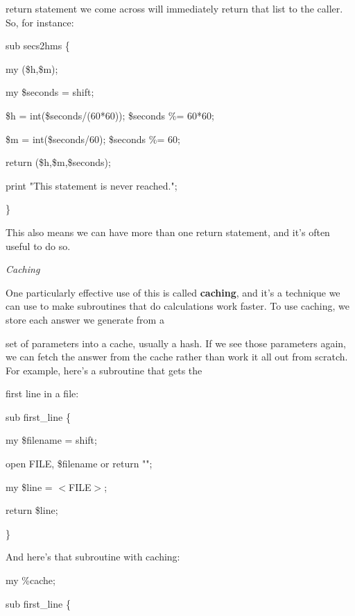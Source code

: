 \documentclass[a4paper,11pt]{book}
\begin{document}
\noindent return statement we come across will immediately return that list to the caller. So, for instance:

\noindent 

\noindent 

\noindent sub secs2hms \{

\noindent my (\$h,\$m);

\noindent my \$seconds = shift;

\noindent \$h = int(\$seconds/(60*60)); \$seconds \%= 60*60;

\noindent \$m = int(\$seconds/60); \$seconds \%= 60;

\noindent return (\$h,\$m,\$seconds);

\noindent print "This statement is never reached.";

\noindent \}

\noindent 

\noindent This also means we can have more than one return statement, and it's often useful to do so.

\noindent 

\noindent \textit{Caching}

\noindent One particularly effective use of this is called \textbf{caching}, and it's a technique we can use to make subroutines that do calculations work faster. To use caching, we store each answer we generate from a

\noindent set of parameters into a cache, usually a hash. If we see those parameters again, we can fetch the answer from the cache rather than work it all out from scratch. For example, here's a subroutine that gets the

\noindent first line in a file:

\noindent 

\noindent sub first\_line \{

\noindent my \$filename = shift;

\noindent open FILE, \$filename or return "";

\noindent my \$line = $<$FILE$>$;

\noindent return \$line;

\noindent \}

\noindent 

\noindent 

\noindent And here's that subroutine with caching:

\noindent 

\noindent my \%cache;

\noindent sub first\_line \{
\end{document}
